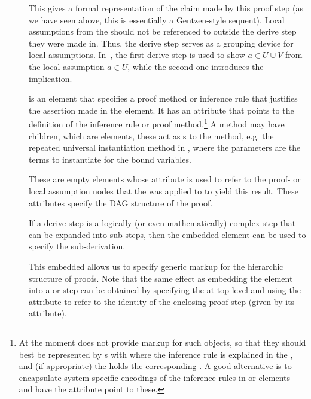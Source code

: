 \begin{description}
\item[{}] This gives a formal representation of the claim made by
  this proof step (as we have seen above, this is essentially a Gentzen-style
  sequent). Local assumptions from the {} should not be referenced to
  outside the derive step they were made in.  Thus, the derive step serves as a
  grouping device for local assumptions.  In~, the first
  derive step is used to show $a\in U\cup V$ from the local assumption $a\in U$,
  while the second one introduces the implication.
\item[{}] is an element that specifies a proof method or inference
  rule that justifies the assertion made in the {} element.  It has
  an {} attribute that points to the {\omdoc} definition
  {} of the inference rule or proof method.\footnote{At the
    moment {\omdoc} does not provide markup for such objects, so that they should
    best be represented by {}s with {} where
    the inference rule is explained in the {}, and (if appropriate)
    the {} holds the corresponding {}. A good
    alternative is to encapsulate system-specific encodings of the inference rules
    in {} or {} elements and have the
    {} attribute point to these.} A method may have
  children, which are {} elements, these act as
  {}s to the method, e.g. the repeated universal instantiation
  method in {}, where the parameters are the terms to instantiate
  for the bound variables.
\item[{}] These are empty elements whose {}
  attribute is used to refer to the proof- or local assumption nodes that the
  {} was applied to to yield this result. These attributes specify
  the DAG structure of the proof.
\item[{}] If a derive step is a logically (or even mathematically)
  complex step that can be expanded into sub-steps, then the embedded
  {} element can be used to specify the sub-derivation.
  
  This embedded {} allows us to specify generic markup for the
  hierarchic structure of proofs. Note that the same effect as embedding the
  {} element into a {} or {} step
  can be obtained by specifying the {} at top-level and using the
  {} attribute to refer to the identity of the enclosing
  proof step (given by its {} attribute).
\end{description}

